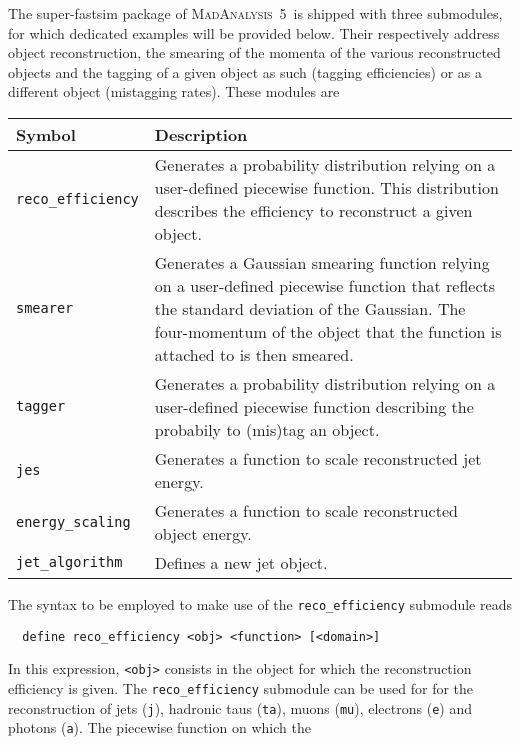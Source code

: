 \documentclass[a4paper]{article}
\newcommand{\MA}{\textsc{MadAnalysis}~5}
\begin{document}
\vspace{2cm}

\noindent The super-fastsim package of \MA\ is shipped with three
submodules, for which dedicated examples will be provided below. Their
respectively address object reconstruction, the smearing of the momenta of the
various reconstructed objects and the tagging of a given object as such (tagging
efficiencies) or as a different object (mistagging rates). These modules are
\renewcommand{\arraystretch}{1.2}%
\begin{center}\begin{tabular}{l p{8.4cm}}
  \hline
  Symbol& Description\\
  \hline
  \color{ao} \verb?reco_efficiency? & Generates a probability
    distribution relying on a user-defined piecewise function. This distribution
    describes the efficiency to reconstruct a given object.\\
  \color{ao} \verb?smearer?  &  Generates a Gaussian smearing function relying
    on a user-defined piecewise function that reflects the standard deviation of
    the Gaussian. The four-momentum of the object that the function is attached
    to is then smeared.\\
  \color{ao} \verb?tagger?   & Generates a probability distribution relying on a
    user-defined piecewise function describing the probabily to (mis)tag an
    object. \\
  \color{ao} \verb?jes?   & Generates a function to scale reconstructed jet energy. \\
  \color{ao} \verb?energy_scaling?   & Generates a function to scale reconstructed object energy. \\

  \color{ao} \verb?jet_algorithm?   & Defines a new jet object. \\
  
    \hline
 \end{tabular}
\end{center}
\noindent The syntax to be employed to make use of the \verb+reco_efficiency+
submodule reads
{\color{ao} \begin{verbatim}
  define reco_efficiency <obj> <function> [<domain>]
\end{verbatim}}
\noindent In this expression, \verb+<obj>+ consists in the object for which the
reconstruction efficiency is given. The {\tt reco\_efficiency} submodule can be
used for for the reconstruction of jets (\verb+j+), hadronic taus (\verb+ta+),
muons (\verb+mu+),
electrons (\verb+e+) and photons (\verb+a+). The piecewise function on which the
\end{document}
